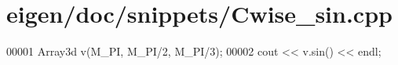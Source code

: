 \hypertarget{eigen_2doc_2snippets_2_cwise__sin_8cpp_source}{}\section{eigen/doc/snippets/\+Cwise\+\_\+sin.cpp}
\label{eigen_2doc_2snippets_2_cwise__sin_8cpp_source}

\begin{DoxyCode}
00001 Array3d v(M\_PI, M\_PI/2, M\_PI/3);
00002 cout << v.sin() << endl;
\end{DoxyCode}
